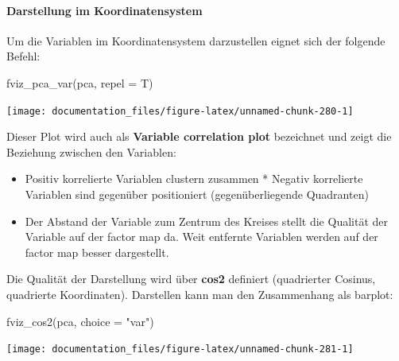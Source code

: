 \documentclass[
]{article}
\newenvironment{Shaded}{\begin{snugshade}}{\end{snugshade}}
\newcommand{\AttributeTok}[1]{\textcolor[rgb]{0.77,0.63,0.00}{#1}}
\newcommand{\FunctionTok}[1]{\textcolor[rgb]{0.00,0.00,0.00}{#1}}
\newcommand{\NormalTok}[1]{#1}
\newcommand{\StringTok}[1]{\textcolor[rgb]{0.31,0.60,0.02}{#1}}
\providecommand{\tightlist}{%
  \setlength{\itemsep}{0pt}\setlength{\parskip}{0pt}}
\begin{document}
\hypertarget{darstellung-im-koordinatensystem}{%
\paragraph{Darstellung im Koordinatensystem}\label{darstellung-im-koordinatensystem}}

Um die Variablen im Koordinatensystem darzustellen eignet sich der folgende Befehl:

\begin{Shaded}
\begin{Highlighting}[]

\FunctionTok{fviz\_pca\_var}\NormalTok{(pca, }\AttributeTok{repel =}\NormalTok{ T)}
\end{Highlighting}
\end{Shaded}

\begin{center}\texttt{[image: documentation\_files/figure-latex/unnamed-chunk-280-1]} \end{center}

Dieser Plot wird auch als \textbf{Variable correlation plot} bezeichnet und zeigt die Beziehung zwischen den Variablen:

\begin{itemize}
\tightlist
\item
  Positiv korrelierte Variablen clustern zusammen * Negativ korrelierte Variablen sind gegenüber positioniert (gegenüberliegende Quadranten)
\item
  Der Abstand der Variable zum Zentrum des Kreises stellt die Qualität der Variable auf der factor map da. Weit entfernte Variablen werden auf der factor map besser dargestellt.
\end{itemize}

Die Qualität der Darstellung wird über \textbf{cos2} definiert (quadrierter Cosinus, quadrierte Koordinaten). Darstellen kann man den Zusammenhang als barplot:

\begin{Shaded}
\begin{Highlighting}[]

\FunctionTok{fviz\_cos2}\NormalTok{(pca, }\AttributeTok{choice =} \StringTok{"var"}\NormalTok{)}
\end{Highlighting}
\end{Shaded}

\begin{center}\texttt{[image: documentation\_files/figure-latex/unnamed-chunk-281-1]} \end{center}
\end{document}
